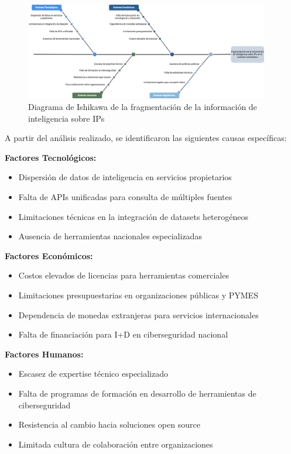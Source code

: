 \begin{figure}[H]
    \centering
    \includegraphics[width=0.95\textwidth]{sections/images/diagrama-ishikawa.png} %
    \caption{Diagrama de Ishikawa de la fragmentación de la información de inteligencia sobre IPs}
    \label{fig:ishikawa_ips}
\end{figure}

A partir del análisis realizado, se identificaron las siguientes causas específicas:

\textbf{Factores Tecnológicos:}
\begin{itemize}
    \item Dispersión de datos de inteligencia en servicios propietarios
    \item Falta de APIs unificadas para consulta de múltiples fuentes
    \item Limitaciones técnicas en la integración de datasets heterogéneos
    \item Ausencia de herramientas nacionales especializadas
\end{itemize}

\textbf{Factores Económicos:}
\begin{itemize}
    \item Costos elevados de licencias para herramientas comerciales
    \item Limitaciones presupuestarias en organizaciones públicas y PYMES
    \item Dependencia de monedas extranjeras para servicios internacionales
    \item Falta de financiación para I+D en ciberseguridad nacional
\end{itemize}

\textbf{Factores Humanos:}
\begin{itemize}
    \item Escasez de expertise técnico especializado
    \item Falta de programas de formación en desarrollo de herramientas de ciberseguridad
    \item Resistencia al cambio hacia soluciones open source
    \item Limitada cultura de colaboración entre organizaciones
\end{itemize}

